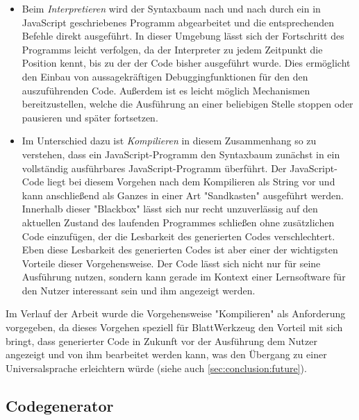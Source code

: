 \begin{itemize}
  \item Beim \emph{Interpretieren} wird der Syntaxbaum nach und nach durch ein in JavaScript geschriebenes Programm abgearbeitet und die entsprechenden Befehle direkt ausgeführt. In dieser Umgebung lässt sich der Fortschritt des Programms leicht verfolgen, da der Interpreter zu jedem Zeitpunkt die Position kennt, bis zu der der Code bisher ausgeführt wurde. Dies ermöglicht den Einbau von aussagekräftigen Debuggingfunktionen für den den auszuführenden Code. Außerdem ist es leicht möglich Mechanismen bereitzustellen, welche die Ausführung an einer beliebigen Stelle stoppen oder pausieren und später fortsetzen.
  \item Im Unterschied dazu ist \emph{Kompilieren} in diesem Zusammenhang so zu verstehen, dass ein Java\-Script-Pro\-gramm den Syntaxbaum zunächst in ein vollständig ausführbares Java\-Script-Pro\-gramm überführt. Der Java\-Script-Code liegt bei diesem Vorgehen nach dem Kompilieren als String vor und kann anschließend als Ganzes in einer Art "Sandkasten" ausgeführt werden. Innerhalb dieser "Blackbox" lässt sich nur recht unzuverlässig auf den aktuellen Zustand des laufenden Programmes schließen ohne zusätzlichen Code einzufügen, der die Lesbarkeit des generierten Codes verschlechtert. Eben diese Lesbarkeit des generierten Codes ist aber einer der wichtigsten Vorteile dieser Vorgehensweise. Der Code lässt sich nicht nur für seine Ausführung nutzen, sondern kann gerade im Kontext einer Lernsoftware für den Nutzer interessant sein und ihm angezeigt werden.
\end{itemize}

Im Verlauf der Arbeit wurde die Vorgehensweise "Kompilieren" als Anforderung vorgegeben, da dieses Vorgehen speziell für BlattWerkzeug den Vorteil mit sich bringt, dass generierter Code in Zukunft vor der Ausführung dem Nutzer angezeigt und von ihm bearbeitet werden kann, was den Übergang zu einer Universalsprache erleichtern würde (siehe auch \ref{sec:conclusion:future}).

\subsection{Codegenerator}
\label{sec:implementation:evaluation:codegenerator}

